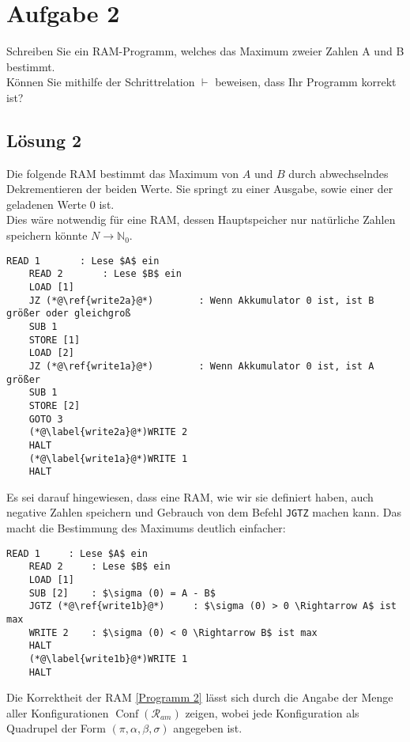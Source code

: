 \documentclass[main.tex]{subfiles}
\begin{document}
\section{Aufgabe 2}

Schreiben Sie ein RAM-Programm, welches das Maximum zweier Zahlen A und B bestimmt.\\
Können Sie mithilfe der Schrittrelation $\vdash$ beweisen, dass Ihr Programm korrekt ist?

\subsection{Lösung 2}

Die folgende RAM bestimmt das Maximum von $A$ und $B$ durch abwechselndes Dekrementieren
der beiden Werte. Sie springt zu einer Ausgabe, sowie einer der geladenen Werte $0$ ist.\\
Dies wäre notwendig für eine RAM, dessen Hauptspeicher nur natürliche Zahlen speichern könnte $N \to \mathbb{N}_0$.

\begin{lstlisting}[language=RAM, caption={Maximum von $A$ und $B$ wenn $N \to \mathbb{N}_0$}, label={Programm 1}]
    READ 1		 : Lese $A$ ein
    READ 2		 : Lese $B$ ein
    LOAD [1]
    JZ (*@\ref{write2a}@*)        : Wenn Akkumulator 0 ist, ist B größer oder gleichgroß
    SUB 1
    STORE [1]
    LOAD [2]
    JZ (*@\ref{write1a}@*)        : Wenn Akkumulator 0 ist, ist A größer
    SUB 1
    STORE [2]
    GOTO 3
    (*@\label{write2a}@*)WRITE 2
    HALT
    (*@\label{write1a}@*)WRITE 1
    HALT
\end{lstlisting}

Es sei darauf hingewiesen, dass eine RAM, wie wir sie definiert haben, auch negative Zahlen speichern
und Gebrauch von dem Befehl \lstinline[language=RAM]{JGTZ} machen kann.
Das macht die Bestimmung des Maximums deutlich einfacher:

\begin{lstlisting}[language=RAM, caption={Maximum von A und B bei $N \to \mathbb{Z}$}, label={Programm 2}]
    READ 1     : Lese $A$ ein
    READ 2     : Lese $B$ ein
    LOAD [1]
    SUB [2]    : $\sigma (0) = A - B$
    JGTZ (*@\ref{write1b}@*)     : $\sigma (0) > 0 \Rightarrow A$ ist max
    WRITE 2    : $\sigma (0) < 0 \Rightarrow B$ ist max
    HALT
    (*@\label{write1b}@*)WRITE 1
    HALT
\end{lstlisting}

Die Korrektheit der RAM \ref{Programm 2} lässt sich durch die Angabe der Menge aller Konfigurationen $\operatorname{Conf}(\mathcal{R}_{am})$ zeigen,
wobei jede Konfiguration als Quadrupel der Form $(\pi , \alpha , \beta , \sigma)$ angegeben ist.
\end{document}
